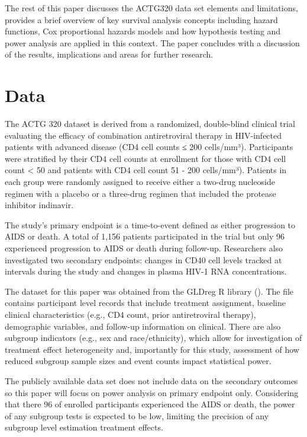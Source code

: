 \documentclass[
  letterpaper,
  DIV=11,
  numbers=noendperiod]{scrartcl}
\begin{document}
The rest of this paper discusses the ACTG320 data set elements and
limitations, provides a brief overview of key survival analysis concepts
including hazard functions, Cox proportional hazards models and how
hypothesis testing and power analysis are applied in this context. The
paper concludes with a discussion of the results, implications and areas
for further research.

\section{Data}\label{data}

The ACTG 320 dataset is derived from a randomized, double-blind clinical
trial evaluating the efficacy of combination antiretroviral therapy in
HIV-infected patients with advanced disease (CD4 cell counts ≤ 200
cells/mm³). Participants were stratified by their CD4 cell counts at
enrollment for those with CD4 cell count \textless{} 50 and patients
with CD4 cell count 51 - 200 cells/mm³). Patients in each group were
randomly assigned to receive either a two-drug nucleoside regimen with a
placebo or a three-drug regimen that included the protease inhibitor
indinavir.

The study's primary endpoint is a time-to-event defined as either
progression to AIDS or death. A total of 1,156 patients participated in
the trial but only 96 experienced progression to AIDS or death during
follow-up. Researchers also investigated two secondary endpoints:
changes in CD40 cell levels tracked at intervals during the study and
changes in plasma HIV-1 RNA concentrations.

The dataset for this paper was obtained from the GLDreg R library
(). The file contains participant
level records that include treatment assignment, baseline clinical
characteristics (e.g., CD4 count, prior antiretroviral therapy),
demographic variables, and follow-up information on clinical. There are
also subgroup indicators (e.g., sex and race/ethnicity), which allow for
investigation of treatment effect heterogeneity and, importantly for
this study, assessment of how reduced subgroup sample sizes and event
counts impact statistical power.

The publicly available data set does not include data on the secondary
outcomes so this paper will focus on power analysis on primary endpoint
only. Considering that there 96 of enrolled participants experienced the
AIDS or death, the power of any subgroup tests is expected to be low,
limiting the precision of any subgroup level estimation treatment
effects.
\end{document}
